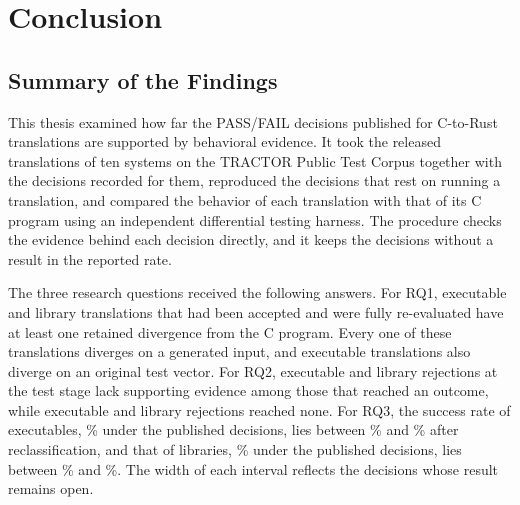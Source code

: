 \chapter{Conclusion}\label{ch:conclusion}

\section{Summary of the Findings}\label{sec:c-summary}

\enlargethispage{\baselineskip} This thesis examined how far the PASS/FAIL decisions published for C-to-Rust translations are supported by behavioral evidence. It took the released translations of ten systems on the TRACTOR Public Test Corpus together with the decisions recorded for them, reproduced the decisions that rest on running a translation, and compared the behavior of each translation with that of its C program using an independent differential testing harness. The procedure checks the evidence behind each decision directly, and it keeps the decisions without a result in the reported rate.

 The three research questions received the following answers. For RQ1,  executable and  library translations that had been accepted and were fully re-evaluated have at least one retained divergence from the C program. Every one of these translations diverges on a generated input, and \rqDivTransLayerSExeAllNum{} executable translations also diverge on an original test vector. For RQ2,  executable and  library rejections at the test stage lack supporting evidence among those that reached an outcome, while \rqLrExeAllNum{} executable and \rqLrLibAllNum{} library rejections reached none. For RQ3, the success rate of executables, \rqSRExeAllPct\% under the published decisions, lies between \rqSRLoExeAllPct\% and \% after reclassification, and that of libraries, \rqSRLibAllPct\% under the published decisions, lies between \rqSRLoLibAllPct\% and \rqSRUpLibAllPct\%. The width of each interval reflects the decisions whose result remains open.

